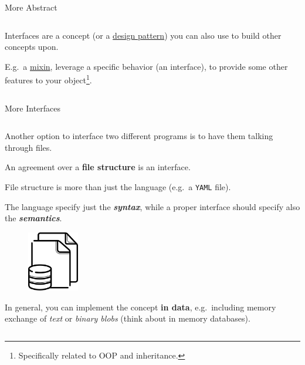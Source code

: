 \documentclass[9pt]{beamer}
\begin{document}
\begin{frame}[fragile]{More Abstract}
\begin{columns}
\begin{column}{0.5\textwidth}
            Interfaces are a concept (or a
            \href{https://refactoring.guru/design-patterns}{design pattern})
            you can also use to build other concepts upon.\newline

            E.g.\ a \href{https://en.wikipedia.org/wiki/Mixin}{mixin}, leverage
            a specific behavior (an interface), to provide some other features
            to your object\footnote{
                Specifically related to OOP and inheritance.
            }.
        \end{column}
    \end{columns}
\end{frame}

\begin{frame}[fragile]{More Interfaces}
    \begin{columns}
        \begin{column}{0.5\textwidth}
            Another option to interface two different programs is to have them
            talking through files.\newline

            An agreement over a \textbf{file structure} is an interface.
            \begin{flushright}
                \footnotesize
                File structure is more than just the language (e.g.\ a
                \texttt{YAML} file).

                \hspace*{10em} The language specify just the
                \textbf{\textit{syntax}}, while a proper interface should
                specify also the \textbf{\textit{semantics}}.
            \end{flushright}

            \begin{figure}
                \centering
                \includegraphics[width=0.2\textwidth]{data-file}
            \end{figure}

            In general, you can implement the concept \alert{\textbf{in data}},
            e.g.\ including memory exchange of \textit{text} or \textit{binary
            blobs} (think about in memory databases).


\end{column}
\end{columns}
\end{frame}
\end{document}
